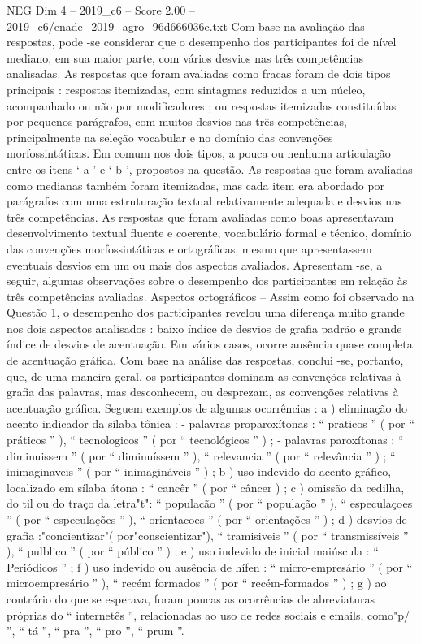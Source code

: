 \begin{textsample}{NEG Dim 4 – 2019\_c6 – Score 2.00 – 2019\_c6/enade\_2019\_agro\_96d666036e.txt}
Com base na avaliação das respostas, pode -se considerar que o desempenho dos participantes foi de nível mediano, em sua maior parte, com vários desvios nas três competências analisadas.
As respostas que foram avaliadas como fracas foram de dois tipos principais : respostas itemizadas, com sintagmas reduzidos a um núcleo, acompanhado ou não por modificadores ; ou respostas itemizadas constituídas por pequenos parágrafos, com muitos desvios nas três competências, principalmente na seleção vocabular e no domínio das convenções morfossintáticas.
Em comum nos dois tipos, a pouca ou nenhuma articulação entre os itens ‘ a ’ e ‘ b ’, propostos na questão.
As respostas que foram avaliadas como medianas também foram itemizadas, mas cada item era abordado por parágrafos com uma estruturação textual relativamente adequada e desvios nas três competências.
As respostas que foram avaliadas como boas apresentavam desenvolvimento textual fluente e coerente, vocabulário formal e técnico, domínio das convenções morfossintáticas e ortográficas, mesmo que apresentassem eventuais desvios em um ou mais dos aspectos avaliados.
Apresentam -se, a seguir, algumas observações sobre o desempenho dos participantes em relação às três competências avaliadas.
Aspectos ortográficos – Assim como foi observado na Questão 1, o desempenho dos participantes revelou uma diferença muito grande nos dois aspectos analisados : baixo índice de desvios de grafia padrão e grande índice de desvios de acentuação.
Em vários casos, ocorre ausência quase completa de acentuação gráfica.
Com base na análise das respostas, conclui -se, portanto, que, de uma maneira geral, os participantes dominam as convenções relativas à grafia das palavras, mas desconhecem, ou desprezam, as convenções relativas à acentuação gráfica.
Seguem exemplos de algumas ocorrências : a ) eliminação do acento indicador da sílaba tônica : - palavras proparoxítonas : “ praticos ” ( por “ práticos ” ), “ tecnologicos ” ( por “ tecnológicos ” ) ; - palavras paroxítonas : “ diminuissem ” ( por “ diminuíssem ” ), “ relevancia ” ( por “ relevância ” ) ; “ inimaginaveis ” ( por “ inimagináveis ” ) ; b ) uso indevido do acento gráfico, localizado em sílaba átona : “ cancêr ” ( por “ câncer ) ; c ) omissão da cedilha, do til ou do traço da letra"t": “ populacão ” ( por “ população ” ), “ especulaçoes ” ( por “ especulações ” ), “ orientacoes ” ( por “ orientações ” ) ; d ) desvios de grafia :"concientizar"( por"conscientizar"), “ tramisiveis ” ( por “ transmissíveis ” ), “ pulblico ” ( por “ público ” ) ; e ) uso indevido de inicial maiúscula : “ Periódicos ” ; f ) uso indevido ou ausência de hífen : “ micro-empresário ” ( por “ microempresário ” ), “ recém formados ” ( por “ recém-formados ” ) ; g ) ao contrário do que se esperava, foram poucas as ocorrências de abreviaturas próprias do “ internetês ”, relacionadas ao uso de redes sociais e emails, como"p/ ”, “ tá ”, “ pra ”, “ pro ”, “ prum ”.

\end{textsample}
